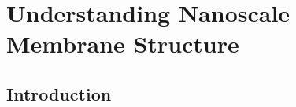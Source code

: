 \chapter{Understanding Nanoscale Membrane Structure}\label{chapter:structure}
  
  \section{Introduction}

%
%
